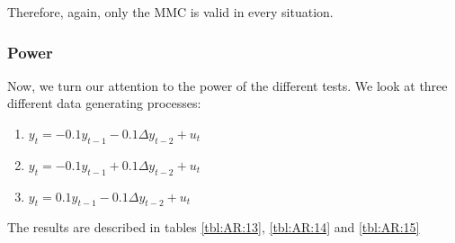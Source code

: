 \documentclass[]{article}\usepackage[]{graphicx}\usepackage[]{color}
\begin{document}
Therefore, again, only the MMC is valid in every situation.

\subsubsection{Power}

Now, we turn our attention to the power of the different tests. We look at three different data generating processes:
\begin{enumerate}
	\item $y_t = -0.1 y_{t-1} - 0.1  \Delta y_{t-2} +u_t$
	\item $y_t = -0.1 y_{t-1} + 0.1 \Delta y_{t-2} +u_t$
	\item $y_t = 0.1 y_{t-1} - 0.1  \Delta y_{t-2} +u_t$
\end{enumerate}

The results are described in tables \ref{tbl:AR:13}, \ref{tbl:AR:14}  and \ref{tbl:AR:15}


\begin{table}[H]
	\centering
	\caption{Empirical levels for 250 replications of AR(p) process where $\alpha = 5\%$ and n=50, testing $H_0: \gamma = 0$ against $H_1:  \gamma < 0$}
	\label{tbl:AR:13}
\end{table}
\end{document}
